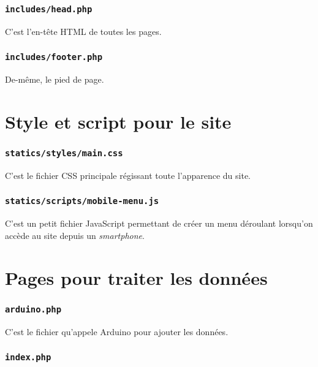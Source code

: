 \cprotect\subsubsection{\verb-includes/head.php-}

C'est l'en-tête HTML de toutes les pages.

\cprotect\subsubsection{\verb-includes/footer.php-}

De-même, le pied de page.

\section{Style et script pour le site}

\cprotect\subsubsection{\verb-statics/styles/main.css-}

C'est le fichier CSS principale régissant toute l'apparence du site.

\cprotect\subsubsection{\verb|statics/scripts/mobile-menu.js|}

C'est un petit fichier JavaScript permettant de créer un menu déroulant lorsqu'on accède au site depuis un \emph{smartphone}.

\section{Pages pour traiter les données}

\cprotect\subsubsection{\verb-arduino.php-}

C'est le fichier qu'appele Arduino pour ajouter les données.

\cprotect\subsubsection{\verb-index.php-}

